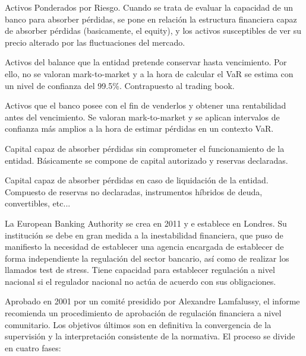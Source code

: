 \documentclass{nuevotema}
\begin{document}
\conceptos


Activos Ponderados por Riesgo. Cuando se trata de evaluar la capacidad de un banco para absorber pérdidas, se pone en relación la estructura financiera capaz de absorber pérdidas (basicamente, el equity), y los activos susceptibles de ver su precio alterado por las fluctuaciones del mercado.


Activos del balance que la entidad pretende conservar hasta vencimiento. Por ello, no se valoran mark-to-market y a la hora de calcular el VaR se estima con un nivel de confianza del 99.5\%. Contrapuesto al trading book.


Activos que el banco posee con el fin de venderlos y obtener una rentabilidad antes del vencimiento. Se valoran mark-to-market y se aplican intervalos de confianza más amplios a la hora de estimar pérdidas en un contexto VaR.


Capital capaz de absorber pérdidas sin comprometer el funcionamiento de la entidad. Básicamente se compone de capital autorizado y reservas declaradas.


Capital capaz de absorber pérdidas en caso de liquidación de la entidad. Compuesto de reservas no declaradas, instrumentos híbridos de deuda, convertibles, etc...


La European Banking Authority se crea en 2011 y e establece en Londres. Su institución se debe en gran medida a la inestabilidad financiera, que puso de manifiesto la necesidad de establecer una agencia encargada de establecer de forma independiente la regulación del sector bancario, así como de realizar los llamados test de stress. Tiene capacidad para establecer regulación a nivel nacional si el regulador nacional no actúa de acuerdo con sus obligaciones.


Aprobado en 2001 por un comité presidido por Alexandre Lamfalussy, el informe recomienda un procedimiento de aprobación de regulación financiera a nivel comunitario. Los objetivos últimos son en definitiva la convergencia de la supervisión y la interpretación consistente de la normativa. El proceso se divide en cuatro fases: 
\end{document}
